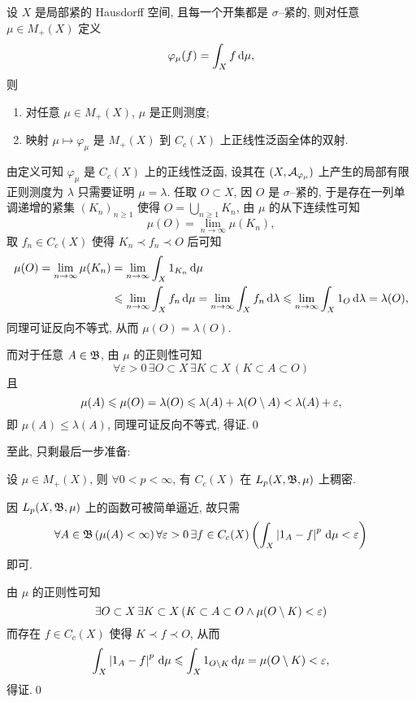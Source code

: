 	\begin{Proposition}
		设 $ X $ 是局部紧的 Hausdorff 空间, 且每一个开集都是 $ \sigma $--紧的, 则对任意 $ \mu\in M_+(X) $ 定义
		\[
			\varphi_\mu(f)=\int_Xf\,\mathrm{d}\mu,
		\]
		则
		\begin{enumerate}[(1)]
			\item 对任意 $ \mu\in M_+(X) $, $ \mu $ 是正则测度;
			\item 映射 $ \mu\mapsto\varphi_\mu $ 是 $ M_+(X) $ 到 $ C_c(X) $ 上正线性泛函全体的双射.
		\end{enumerate}
	\end{Proposition}
	\begin{Proof}
		由定义可知 $ \varphi_\mu $ 是 $ C_c(X) $ 上的正线性泛函, 设其在 $ (X,\mathcal{A}_{\varphi_\mu}) $ 上产生的局部有限正则测度为 $ \lambda $ 只需要证明 $ \mu=\lambda $. 任取 $ O\subset X $, 因 $ O $ 是 $ \sigma $--紧的, 于是存在一列单调递增的紧集 $ (K_n)_{n\geqslant 1} $ 使得 $ O=\bigcup\limits_{n\geqslant 1}K_n $, 由 $ \mu $ 的从下连续性可知
		\[
			\mu(O)=\lim_{n\to\infty}\mu(K_n),
		\]
		取 $ f_n\in C_c(X) $ 使得 $ K_n\prec f_n\prec O $ 后可知
		\[
			\begin{aligned}
				\mu(O)=\lim_{n\to\infty}\mu(K_n)&=\lim_{n\to\infty}\int_X1_{K_n}\,\mathrm{d}\mu\\
				&\leqslant\lim_{n\to\infty}\int_Xf_n\,\mathrm{d}\mu=\lim_{n\to\infty}\int_Xf_n\,\mathrm{d}\lambda\leqslant\lim_{n\to\infty}\int_X1_O\,\mathrm{d}\lambda=\lambda(O),
			\end{aligned}
		\]
		同理可证反向不等式, 从而 $ \mu(O)=\lambda(O) $.

		而对于任意 $ A\in\mathfrak{B} $, 由 $ \mu $ 的正则性可知
		\[
			\forall\varepsilon>0\,\exists O\subset X\,\exists K\subset X\,(K\subset A\subset O)
		\]
		且
		\[
			\mu(A)\leqslant\mu(O)=\lambda(O)\leqslant\lambda(A)+\lambda(O\setminus A)<\lambda(A)+\varepsilon,
		\]
		即 $ \mu(A)\leqslant\lambda(A) $, 同理可证反向不等式, 得证.\qed
	\end{Proof}

	至此, 只剩最后一步准备:

	\begin{Proposition}
		设 $ \mu\in M_+(X) $, 则 $ \forall 0<p<\infty $, 有 $ C_c(X) $ 在 $ L_p(X,\mathfrak{B},\mu) $ 上稠密.
	\end{Proposition}
	\begin{Proof}
		因 $ L_p(X,\mathfrak{B},\mu) $ 上的函数可被简单逼近, 故只需
		\[
			\forall A\in\mathfrak{B}\,(\mu(A)<\infty)\,\forall \varepsilon>0\,\exists f\in C_c(X)\left( \int_X\left| 1_A-f \right| ^p\,\mathrm{d}\mu<\varepsilon \right)
		\]
		即可.

		由 $ \mu $ 的正则性可知
		\[
			\exists O\subset X\,\exists K\subset X\,(K\subset A\subset O\land\mu(O\setminus K)<\varepsilon)
		\]
		而存在 $ f\in C_c(X) $ 使得 $ K\prec f\prec O $, 从而
		\[
			\int_X\left| 1_A-f \right| ^p\,\mathrm{d}\mu\leqslant\int_X1_{O\setminus K}\,\mathrm{d}\mu=\mu(O\setminus K)<\varepsilon,
		\]
		得证.\qed
	\end{Proof}

